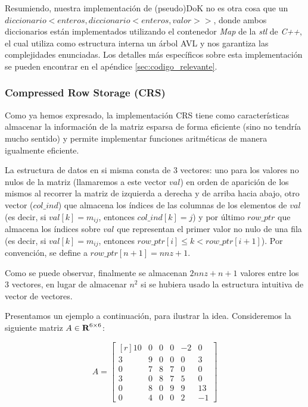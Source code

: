 \par Resumiendo, nuestra implementaci\'on de (pseudo)DoK no es otra cosa que un
$diccionario< enteros,diccionario<enteros,valor>>$, donde ambos diccionarios
est\'an implementados utilizando el contenedor \emph{Map} de la \emph{stl} de
\emph{C++}, el cual utiliza como estructura interna un \'arbol AVL y nos
garantiza las complejidades enunciadas\cite{stl_map}. Los detalles m\'as
espec\'ificos sobre esta implementaci\'on se pueden encontrar en el ap\'endice
\ref{sec:codigo_relevante}.

\subsubsection{Compressed Row Storage (CRS)}
\par Como ya hemos expresado, la implementaci\'on CRS tiene como
caracter\'isticas almacenar la informaci\'on de la matriz esparsa de forma
eficiente (sino no tendr\'ia mucho sentido) y permite implementar funciones
aritm\'eticas de manera igualmente eficiente.

\par La estructura de datos en si misma consta de 3 vectores: uno para los
valores no nulos de la matriz (llamaremos a este vector $val$) en orden de
aparici\'on de los mismos al recorrer la matriz de izquierda a derecha y de
arriba hacia abajo, otro vector ($col\_ind$) que almacena los \'indices de las
columnas de los elementos de $val$ (es decir, si $val[k] = m_{ij}$, entonces
$col\_ind[k] = j$) y por \'ultimo $row\_ptr$ que almacena los \'indices sobre
$val$ que representan el primer valor no nulo de una fila (es decir, si $val[k]
= m_{ij}$, entonces $row\_ptr[i]\leq k < row\_ptr[i+1]$). Por convenci\'on, se
define a $row\_ptr[n+1] = nnz+1$\cite{netlib_crs}.

\par Como se puede observar, finalmente se almacenan $2nnz+n+1$ valores entre
los 3 vectores, en lugar de almacenar $n^2$ si se hubiera usado la estructura
intuitiva de vector de vectores.

\par Presentamos un ejemplo a continuaci\'on, para ilustrar la idea.
Consideremos la siguiente matriz $A\in\hbox{\bf R}^{6\times 6}$\cite{netlib_crs}:

\begin{equation*}
    A = \begin{bmatrix*}[r]
        10 &0 &0 &0 &-2 &0\\[-0.65em]
         3 &9 &0 &0 &0  &3\\[-0.65em]
         0 &7 &8 &7 &0  &0\\[-0.65em]
         3 &0 &8 &7 &5  &0\\[-0.65em]
         0 &8 &0 &9 &9  &13\\[-0.65em]
         0 &4 &0 &0 &2  &-1
    \end{bmatrix*}
\end{equation*}

